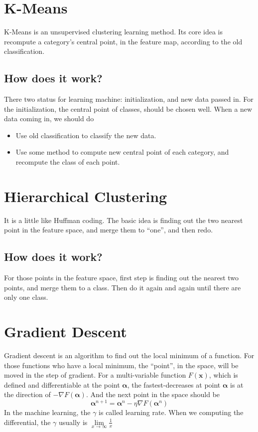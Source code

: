 \documentclass{article}
\begin{document}
\section{K-Means}
\label{sec:kmeans}

K-Means is an unsupervised clustering learning method. Its core idea is recompute a category's central point, in the feature map,  according
to the old classification.

\subsection{How does it work?}
\label{sec:kmeans:how}

There two status for learning machine: initialization, and new data passed in.
For the initialization, the central point of classes, should be chosen well.
When a new data coming in, we should do
\begin{itemize}
	\item Use old classification to classify the new data.
	\item Use some method to compute new central point of each category, and recompute the class of each point.
\end{itemize}

\section{Hierarchical Clustering}
\label{sec:hc}

It is a little like Huffman coding. The basic idea is finding out the two nearest point in the feature space, and merge them to ``one'', and then redo.

\subsection{How does it work?}
\label{sec:hc:how}

For those points in the feature space, first step is finding out the nearest two points, and merge them to a class.
Then do it again and again until there are only one class. 

\section{Gradient Descent}
\label{sec:gd}

Gradient descent is an algorithm to find out the local minimum of a function. For those functions who have a local minimum,
the ``point'', in the space, will be moved in the step of gradient.
For a multi-variable function $F(\mathbf{x})$, which is defined and differentiable at the point $\mathbf{\alpha}$, 
the fastest-decreases at point $\mathbf{\alpha}$ is at the direction of $-\nabla F(\mathbf{\alpha})$.
And the next point in the space should be
\begin{equation}
	\label{eq:gd:next}
	\mathbf{\alpha}^{n+1} = \mathbf{\alpha}^n - \eta\nabla F(\mathbf{\alpha}^n)
\end{equation}
In the machine learning, the $\gamma$ is called learning rate. When we computing the differential, the $\gamma$ usually is $\lim\limits_{x \rightarrow \infty} \frac{1}{x}$
\end{document}
